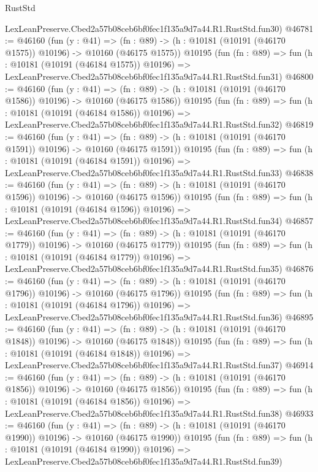 \begin{lexlean}{RustStd}
\begin{coremodule}
    LexLeanPreserve.Cbed2a57b08ceb6bf0fec1f135a9d7a44.R1.RustStd.fun30)
@46781 := @46160
    (fun (y : @41) =>
    (fn : @89) -> (h : @10181 (@10191 (@46170 @1575)) @10196) -> @10160 (@46175 @1575))
    @10195
    (fun (fn : @89) =>
    fun (h : @10181 (@10191 (@46184 @1575)) @10196) =>
    LexLeanPreserve.Cbed2a57b08ceb6bf0fec1f135a9d7a44.R1.RustStd.fun31)
@46800 := @46160
    (fun (y : @41) =>
    (fn : @89) -> (h : @10181 (@10191 (@46170 @1586)) @10196) -> @10160 (@46175 @1586))
    @10195
    (fun (fn : @89) =>
    fun (h : @10181 (@10191 (@46184 @1586)) @10196) =>
    LexLeanPreserve.Cbed2a57b08ceb6bf0fec1f135a9d7a44.R1.RustStd.fun32)
@46819 := @46160
    (fun (y : @41) =>
    (fn : @89) -> (h : @10181 (@10191 (@46170 @1591)) @10196) -> @10160 (@46175 @1591))
    @10195
    (fun (fn : @89) =>
    fun (h : @10181 (@10191 (@46184 @1591)) @10196) =>
    LexLeanPreserve.Cbed2a57b08ceb6bf0fec1f135a9d7a44.R1.RustStd.fun33)
@46838 := @46160
    (fun (y : @41) =>
    (fn : @89) -> (h : @10181 (@10191 (@46170 @1596)) @10196) -> @10160 (@46175 @1596))
    @10195
    (fun (fn : @89) =>
    fun (h : @10181 (@10191 (@46184 @1596)) @10196) =>
    LexLeanPreserve.Cbed2a57b08ceb6bf0fec1f135a9d7a44.R1.RustStd.fun34)
@46857 := @46160
    (fun (y : @41) =>
    (fn : @89) -> (h : @10181 (@10191 (@46170 @1779)) @10196) -> @10160 (@46175 @1779))
    @10195
    (fun (fn : @89) =>
    fun (h : @10181 (@10191 (@46184 @1779)) @10196) =>
    LexLeanPreserve.Cbed2a57b08ceb6bf0fec1f135a9d7a44.R1.RustStd.fun35)
@46876 := @46160
    (fun (y : @41) =>
    (fn : @89) -> (h : @10181 (@10191 (@46170 @1796)) @10196) -> @10160 (@46175 @1796))
    @10195
    (fun (fn : @89) =>
    fun (h : @10181 (@10191 (@46184 @1796)) @10196) =>
    LexLeanPreserve.Cbed2a57b08ceb6bf0fec1f135a9d7a44.R1.RustStd.fun36)
@46895 := @46160
    (fun (y : @41) =>
    (fn : @89) -> (h : @10181 (@10191 (@46170 @1848)) @10196) -> @10160 (@46175 @1848))
    @10195
    (fun (fn : @89) =>
    fun (h : @10181 (@10191 (@46184 @1848)) @10196) =>
    LexLeanPreserve.Cbed2a57b08ceb6bf0fec1f135a9d7a44.R1.RustStd.fun37)
@46914 := @46160
    (fun (y : @41) =>
    (fn : @89) -> (h : @10181 (@10191 (@46170 @1856)) @10196) -> @10160 (@46175 @1856))
    @10195
    (fun (fn : @89) =>
    fun (h : @10181 (@10191 (@46184 @1856)) @10196) =>
    LexLeanPreserve.Cbed2a57b08ceb6bf0fec1f135a9d7a44.R1.RustStd.fun38)
@46933 := @46160
    (fun (y : @41) =>
    (fn : @89) -> (h : @10181 (@10191 (@46170 @1990)) @10196) -> @10160 (@46175 @1990))
    @10195
    (fun (fn : @89) =>
    fun (h : @10181 (@10191 (@46184 @1990)) @10196) =>
    LexLeanPreserve.Cbed2a57b08ceb6bf0fec1f135a9d7a44.R1.RustStd.fun39)

\end{coremodule}
\end{lexlean}
